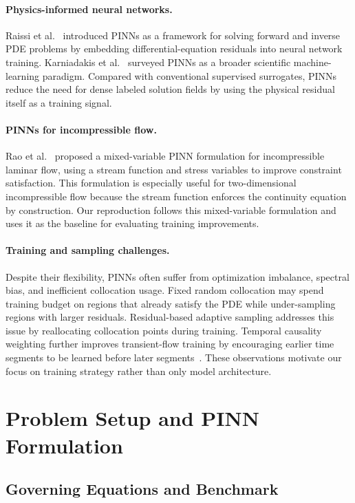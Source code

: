 \documentclass{article}
\begin{document}
\paragraph{Physics-informed neural networks.}
Raissi et al.~\cite{raissi2019pinn} introduced PINNs as a framework for solving forward and inverse PDE problems by embedding differential-equation residuals into neural network training. Karniadakis et al.~\cite{karniadakis2021pinnreview} surveyed PINNs as a broader scientific machine-learning paradigm. Compared with conventional supervised surrogates, PINNs reduce the need for dense labeled solution fields by using the physical residual itself as a training signal.

\paragraph{PINNs for incompressible flow.}
Rao et al.~\cite{rao2020pinnflow} proposed a mixed-variable PINN formulation for incompressible laminar flow, using a stream function and stress variables to improve constraint satisfaction. This formulation is especially useful for two-dimensional incompressible flow because the stream function enforces the continuity equation by construction. Our reproduction follows this mixed-variable formulation and uses it as the baseline for evaluating training improvements.

\paragraph{Training and sampling challenges.}
Despite their flexibility, PINNs often suffer from optimization imbalance, spectral bias, and inefficient collocation usage. Fixed random collocation may spend training budget on regions that already satisfy the PDE while under-sampling regions with larger residuals. Residual-based adaptive sampling addresses this issue by reallocating collocation points during training. Temporal causality weighting further improves transient-flow training by encouraging earlier time segments to be learned before later segments~\cite{wang2024causal}. These observations motivate our focus on training strategy rather than only model architecture.

\section{Problem Setup and PINN Formulation}

\subsection{Governing Equations and Benchmark}
\end{document}
